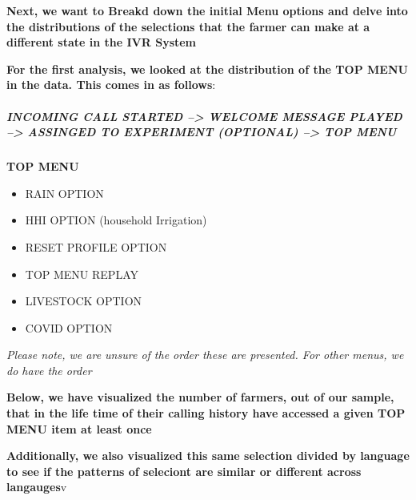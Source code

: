 \documentclass[
]{article}
\providecommand{\tightlist}{%
  \setlength{\itemsep}{0pt}\setlength{\parskip}{0pt}}
\begin{document}
\textbf{Next, we want to Breakd down the initial Menu options and delve
into the distributions of the selections that the farmer can make at a
different state in the IVR System}

\textbf{For the first analysis, we looked at the distribution of the TOP
MENU in the data. This comes in as follows}:

\hypertarget{incoming-call-started-welcome-message-played-assinged-to-experiment-optional-top-menu}{%
\subparagraph{INCOMING CALL STARTED --\textgreater{} WELCOME MESSAGE
PLAYED --\textgreater{} ASSINGED TO EXPERIMENT (OPTIONAL)
--\textgreater{} TOP
MENU}\label{incoming-call-started-welcome-message-played-assinged-to-experiment-optional-top-menu}}

\textbf{TOP MENU}

\begin{itemize}
\tightlist
\item
  RAIN OPTION
\item
  HHI OPTION (household Irrigation)
\item
  RESET PROFILE OPTION
\item
  TOP MENU REPLAY
\item
  LIVESTOCK OPTION
\item
  COVID OPTION
\end{itemize}

\emph{Please note, we are unsure of the order these are presented. For
other menus, we do have the order}

\textbf{Below, we have visualized the number of farmers, out of our
sample, that in the life time of their calling history have accessed a
given TOP MENU item at least once}

\textbf{Additionally, we also visualized this same selection divided by
language to see if the patterns of seleciont are similar or different
across langauges}v
\end{document}
